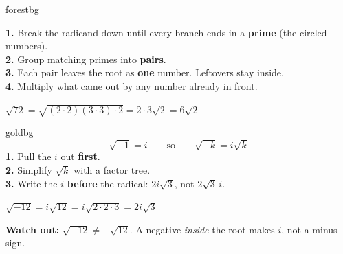 \documentclass[12pt]{article}
\begin{document}

\vspace{0.04in}
\noindent\begin{minipage}[t]{0.55\linewidth}
\vspace{0pt}
\begin{fixedskillbox}{forestbg}
\small
\begin{minipage}[t]{0.40\linewidth}
\vspace{2pt}
\end{minipage}\hfill
\begin{minipage}[t]{0.57\linewidth}
\vspace{2pt}
\textbf{1.} Break the radicand down until every branch ends in a \textbf{prime} (the circled numbers).\\[2pt]
\textbf{2.} Group matching primes into \textbf{pairs}.\\[2pt]
\textbf{3.} Each pair leaves the root as \textbf{one} number. Leftovers stay inside.\\[2pt]
\textbf{4.} Multiply what came out by any number already in front.
\end{minipage}

\vspace{4pt}
$\sqrt{72}=\sqrt{(2\cdot2)(3\cdot3)\cdot2}=2\cdot3\sqrt{2}=6\sqrt{2}$
\end{fixedskillbox}
\end{minipage}\hfill
\begin{minipage}[t]{0.43\linewidth}
\vspace{0pt}
\begin{fixedskillbox}{goldbg}
\small
\[ \sqrt{-1}=i \qquad\text{so}\qquad \sqrt{-k}=i\sqrt{k} \]
\textbf{1.} Pull the $i$ out \textbf{first}.\\[2pt]
\textbf{2.} Simplify $\sqrt{k}$ with a factor tree.\\[2pt]
\textbf{3.} Write the $i$ \textbf{before} the radical: $2i\sqrt{3}$, not $2\sqrt{3}\,i$.

\vspace{4pt}
$\sqrt{-12}=i\sqrt{12}=i\sqrt{2\cdot2\cdot3}=2i\sqrt{3}$

\vspace{3pt}
\textbf{Watch out:} $\sqrt{-12}\neq-\sqrt{12}$. A negative \emph{inside} the root makes $i$, not a minus sign.
\end{fixedskillbox}
\end{minipage}
\end{document}
